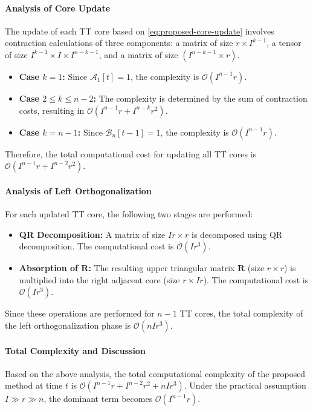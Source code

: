 \documentclass[a4paper, 11pt]{article}
\theoremstyle{plain}
\theoremstyle{definition}
\theoremstyle{remark}
\begin{document}
\paragraph{Analysis of Core Update}
The update of each TT core based on \eqref{eq:proposed-core-update} involves contraction calculations of three components: a matrix of size $r \times I^{k-1}$, a tensor of size $I^{k-1} \times I \times I^{n-k-1}$, and a matrix of size $(I^{n-k-1} \times r)$.
\begin{itemize}
    \item \textbf{Case $k=1$:} Since $\mathcal{A}_1[t] = 1$, the complexity is $\mathcal{O}(I^{n-1} r)$.
    \item \textbf{Case $2 \leq k \leq n-2$:} The complexity is determined by the sum of contraction costs, resulting in $\mathcal{O}(I^{n-1} r + I^{n-k} r^2)$.
    \item \textbf{Case $k=n-1$:} Since $\mathcal{B}_n[t-1] = 1$, the complexity is $\mathcal{O}(I^{n-1} r)$.
\end{itemize}
Therefore, the total computational cost for updating all TT cores is $\mathcal{O}(I^{n-1} r + I^{n-2} r^2)$.

\paragraph{Analysis of Left Orthogonalization}
For each updated TT core, the following two stages are performed:
\begin{itemize}
    \item \textbf{QR Decomposition:} A matrix of size $I r \times r$ is decomposed using QR decomposition. The computational cost is $\mathcal{O}(I r^3)$.
    \item \textbf{Absorption of $\mathbf{R}$:} The resulting upper triangular matrix $\mathbf{R}$ (size $r \times r$) is multiplied into the right adjacent core (size $r \times Ir$). The computational cost is $\mathcal{O}(I r^3)$.
\end{itemize}
Since these operations are performed for $n-1$ TT cores, the total complexity of the left orthogonalization phase is $\mathcal{O}(n I r^3)$.

\paragraph{Total Complexity and Discussion}
Based on the above analysis, the total computational complexity of the proposed method at time $t$ is $\mathcal{O}(I^{n-1} r + I^{n-2} r^2 + n I r^3)$. Under the practical assumption $I \gg r \gg n$, the dominant term becomes $\mathcal{O}(I^{n-1} r)$.
\end{document}
